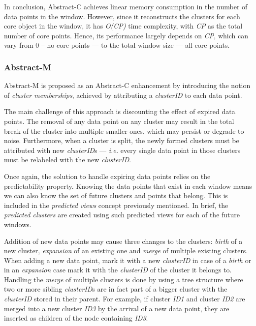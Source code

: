 In conclusion, Abstract-C achieves linear memory consumption in the number of data points in the window. However, since it reconstructs the clusters for each core object in the window, it has \textit{O(CP)} time complexity, with \textit{CP} as the total number of core points. Hence, its performance largely depends on  \textit{CP}, which can vary from 0 -- no core points --- to the total window size --- all core points. 

\subsubsection{Abstract-M}
Abstract-M is proposed as an Abstract-C enhancement by introducing the notion of \textit{cluster memberships}, achieved by attributing a \textit{clusterID} to each data point.

The main challenge of this approach is discounting the effect of expired data points. The removal of any data point on any cluster may result in the total break of the cluster into multiple smaller ones, which may persist or degrade to noise. Furthermore, when a cluster is split, the newly formed clusters must be attributed with new \textit{clusterID}s --- \textit{i.e.} every single data point in those clusters must be relabeled with the new \textit{clusterID}.

Once again, the solution to handle expiring data points relies on the predictability property. Knowing the data points that exist in each window means we can also know the set of future clusters and points that belong. This is included in the \textit{predicted views} concept previously mentioned. In brief, the \textit{predicted clusters} are created using such predicted views for each of the future windows.

Addition of new data points may cause three changes to the clusters: \textit{birth} of a new cluster, \textit{expansion} of an existing one and \textit{merge} of multiple existing clusters. When adding a new data point, mark it with a new \textit{clusterID} in case of a \textit{birth} or in an \textit{expansion} case mark it with the \textit{clusterID} of the cluster it belongs to. Handling the \textit{merge} of multiple clusters is done by using a tree structure where two or more sibling \textit{clusterID}s are in fact part of a bigger cluster with the \textit{clusterID} stored in their parent. For example, if cluster \textit{ID1} and cluster \textit{ID2} are merged into a new cluster \textit{ID3} by the arrival of a new data point, they are inserted as children of the node containing \textit{ID3}.

